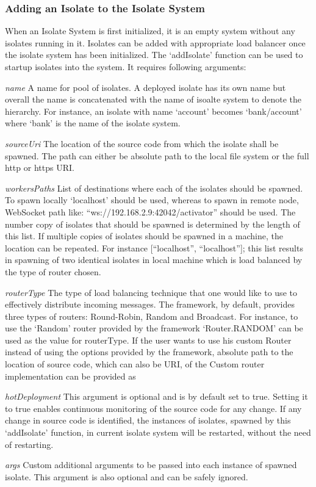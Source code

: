   \subsubsection{Adding an Isolate to the Isolate System}
  When an Isolate System is first initialized, it is an empty system without any isolates running in it. Isolates can be added with appropriate load balancer once the isolate system has been initialized. The ‘addIsolate’ function can be used to startup isolates into the system. It requires following arguments:
  \begin{description}
    \item{\itshape{name}} \textendash{} A name for pool of isolates. A deployed isolate has its own name but overall the name is concatenated with the name of isoalte system to denote the hierarchy. For instance, an isolate with name ‘account’ becomes ‘bank/account’ where ‘bank’ is the name of the isolate system.
    \item{\itshape{sourceUri}} \textendash{} The location of the source code from which the isolate shall be spawned. The path can either be absolute path to the local file system or the full http or https URI.
    \item{\itshape{workersPaths}} \textendash{} List of destinations where each of the isolates should be spawned. To spawn locally ‘localhost’ should be used, whereas to spawn in remote node, WebSocket path like: “ws://192.168.2.9:42042/activator” should be used. The number copy of isolates that should be spawned is determined by the length of this list. If multiple copies of isolates should be spawned in a machine, the location can be repeated. For instance [“localhost”, “localhost”]; this list results in spawning of two identical isolates in local machine which is load balanced by the type of router chosen.
    \item{\itshape{routerType}} \textendash{} The type of load balancing technique that one would like to use to effectively distribute incoming messages. The framework, by default, provides three types of routers: Round-Robin, Random and Broadcast. For instance, to use the ‘Random’ router provided by the framework ‘Router.RANDOM’ can be used as the value for routerType. If the user wants to use his custom Router instead of using the options provided by the framework, absolute path to the location of source code, which can also be URI, of the Custom router implementation can be provided as
    \item{\itshape{hotDeployment}} \textendash{} This argument is optional and is by default set to true. Setting it to true enables continuous monitoring of the source code for any change. If any change in source code is identified, the  instances of isolates, spawned by this ‘addIsolate’ function, in current isolate system will be restarted, without the need of restarting.
    \item{\itshape{args}} \textendash{} Custom additional arguments to be passed into each instance of spawned isolate. This argument is also optional and can be safely ignored.
  \end{description}

